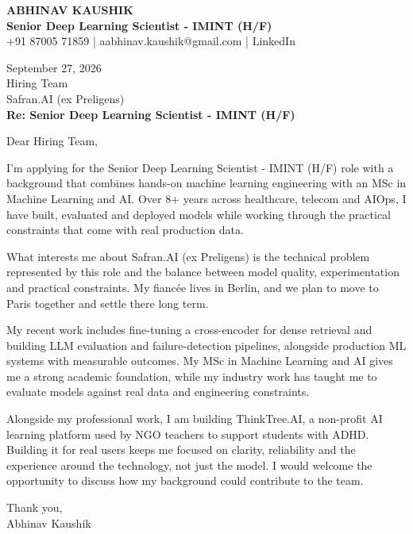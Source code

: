 \documentclass[10pt,a4paper]{article}
\begin{document}
\begin{center}
{\Large\bfseries ABHINAV KAUSHIK}\\[2pt]
{\bfseries Senior Deep Learning Scientist - IMINT (H/F)}\\[2pt]
+91 87005 71859 \quad | \quad aabhinav.kaushik@gmail.com \quad | \quad LinkedIn
\end{center}
\vspace{8pt}
September 27, 2026\\[6pt]
Hiring Team\\
Safran.AI (ex Preligens)\\[4pt]
\textbf{Re: Senior Deep Learning Scientist - IMINT (H/F)}

Dear Hiring Team,

I’m applying for the Senior Deep Learning Scientist - IMINT (H/F) role with a background that combines hands-on machine learning engineering with an MSc in Machine Learning and AI. Over 8+ years across healthcare, telecom and AIOps, I have built, evaluated and deployed models while working through the practical constraints that come with real production data.

What interests me about Safran.AI (ex Preligens) is the technical problem represented by this role and the balance between model quality, experimentation and practical constraints. My fiancée lives in Berlin, and we plan to move to Paris together and settle there long term.

My recent work includes fine-tuning a cross-encoder for dense retrieval and building LLM evaluation and failure-detection pipelines, alongside production ML systems with measurable outcomes. My MSc in Machine Learning and AI gives me a strong academic foundation, while my industry work has taught me to evaluate models against real data and engineering constraints.

Alongside my professional work, I am building ThinkTree.AI, a non-profit AI learning platform used by NGO teachers to support students with ADHD. Building it for real users keeps me focused on clarity, reliability and the experience around the technology, not just the model. I would welcome the opportunity to discuss how my background could contribute to the team.

Thank you,\\
Abhinav Kaushik
\end{document}
